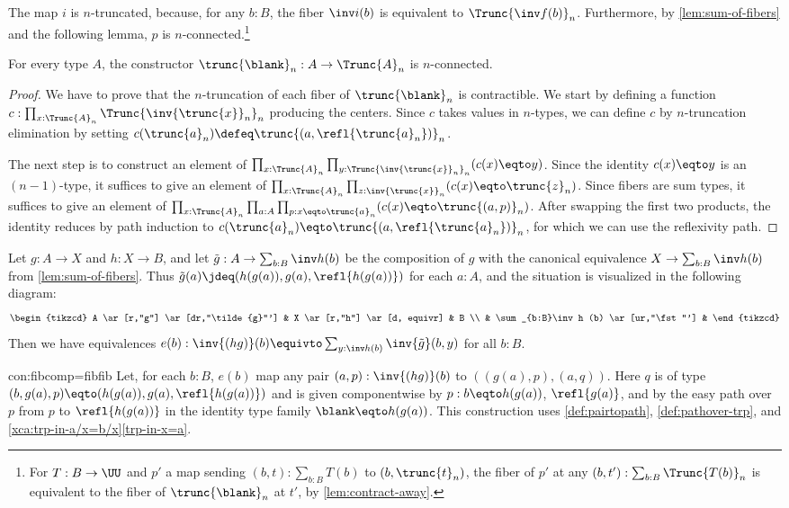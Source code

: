 The map $i$ is $n$-truncated, because, for any $b:B$,
the fiber $\inv i (b)$ is equivalent to $\Trunc{\inv f (b)}_n$.
Furthermore, by \cref{lem:sum-of-fibers} and the following lemma,
$p$ is $n$-connected.\footnote{For $T:B\to\UU$ and $p'$ a map sending
$(b,t):\sum_{b:B}T(b)$ to $(b,\trunc{t}_n)$, the fiber of $p'$ at
any $(b,t'):\sum_{b:B}\Trunc{T(b)}_n$ is equivalent to the
fiber of $\trunc{\blank}_n$ at $t'$, by \cref{lem:contract-away}.}

\begin{lemma}\label{lem:trunc-n-connected}
For every type $A$, the constructor $\trunc{\blank}_n : A\to \Trunc{A}_n$
is $n$-connected.
\end{lemma}
\begin{proof}
We have to prove that the $n$-truncation of each fiber of $\trunc{\blank}_n$
is contractible. We start by defining a function
$c:\prod_{x:\Trunc{A}_n} \Trunc{\inv{\trunc{x}}_n}_n$ producing the centers.
Since $c$ takes values in $n$-types, we can define $c$ by
$n$-truncation elimination by setting
$c(\trunc{a}_n) \defeq \trunc{(a,\refl{\trunc{a}_n})}_n$.

The next step is to construct an element of
$\prod_{x:\Trunc{A}_n} \prod_{y:\Trunc{\inv{\trunc{x}}_n}_n} (c(x)\eqto y)$.
Since the identity $c(x)\eqto y$ is an $(n-1)$-type, it suffices to give an element of
$\prod_{x:\Trunc{A}_n} \prod_{z:\inv{\trunc{x}}_n} (c(x)\eqto \trunc{z}_n)$.
Since fibers are sum types,  it suffices to give an element of
$\prod_{x:\Trunc{A}_n} \prod_{a:A} \prod_{p: x\eqto \trunc{a}_n} (c(x)\eqto \trunc{(a,p)}_n)$.
After swapping the first two products, the identity reduces by path induction
to $c(\trunc{a}_n)\eqto \trunc{(a,\refl{\trunc{a}_n})}_n$, for which we can use
the reflexivity path.
\end{proof}

\begin{construction}\label{con:fibcomp=fibfib}
Let $g:A\to X$ and $h: X\to B$, and let $\tilde{g}:A\to \sum_{b:B}\inv h (b)$
be the composition of $g$ with the canonical equivalence
$X\to \sum_{b:B}\inv h (b)$ from \cref{lem:sum-of-fibers}.
Thus $\tilde{g}(a)\jdeq (h(g(a)),g(a),\refl{h(g(a))})$ for each $a:A$,
and the situation is visualized in the following diagram:
  \[
    \begin{tikzcd}
      A \ar[r,"g"] \ar[dr,"\tilde{g}"'] & X \ar[r,"h"] \ar[d, equivr] & B \\
      & \sum_{b:B}\inv h (b) \ar[ur,"\fst"'] &
    \end{tikzcd}
  \]
Then we have equivalences $e(b) : \inv {(hg)} (b) \equivto \sum_{y:\inv h (b)} \inv {\tilde{g}}(b,y)$
for all $b:B$.
\end{construction}
\begin{implementation}{con:fibcomp=fibfib}
Let, for each $b:B$, $e(b)$ map any pair $(a,p):\inv {(hg)} (b)$ to
$((g(a),p),(a,q))$. Here $q$ is of type $(b,g(a),p) \eqto  (h(g(a)),g(a),\refl{h(g(a))})$
and is given componentwise by $p: b\eqto h(g(a))$, $\refl{g(a)}$, and by the
easy path over $p$ from $p$ to $\refl{h(g(a))}$ in the identity type family $\blank\eqto h(g(a))$.
This construction uses \cref{def:pairtopath}, \cref{def:pathover-trp},
and \cref{xca:trp-in-a/x=b/x}\ref{trp-in-x=a}.
\end{implementation}

